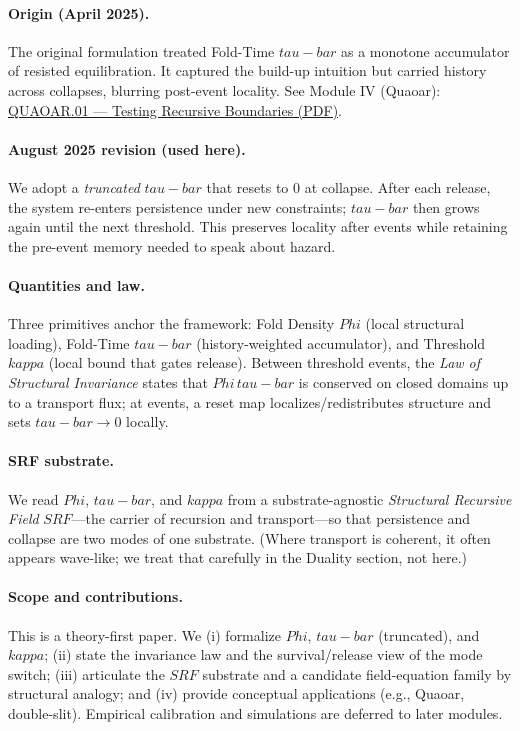 \documentclass[12pt]{article}
\newcommand{\FoldDensity}{\Phi}
\newcommand{\FoldTime}{\bar{\tau}}
\newcommand{\Threshold}{\kappa}
\newcommand{\SRF}{\mathcal{F}_{\mathrm{SR}}}
\def\FoldDensity{Phi}%
\def\FoldTime{tau-bar}%
\def\Threshold{kappa}%
\def\SRF{SRF}%
\def\bar#1{#1}%
\def\mathcal#1{#1}%
\def\mathrm#1{#1}%
\begin{document}
\paragraph{Origin (April 2025).}
The original formulation treated Fold-Time $\FoldTime$ as a monotone accumulator of resisted equilibration. It captured the build-up intuition but carried history across collapses, blurring post-event locality. See Module IV (Quaoar): \href{https://primefoldtheory.org/paper/quaoar_fold_complete_with_figures.pdf}{QUAOAR.01 — Testing Recursive Boundaries (PDF)}.


\paragraph{August 2025 revision (used here).}
We adopt a \emph{truncated} $\FoldTime$ that resets to $0$ at collapse. After each release, the system re-enters persistence under new constraints; $\FoldTime$ then grows again until the next threshold. This preserves locality after events while retaining the pre-event memory needed to speak about hazard.

\paragraph{Quantities and law.}
Three primitives anchor the framework: Fold Density $\FoldDensity$ (local structural loading), Fold-Time $\FoldTime$ (history-weighted accumulator), and Threshold $\Threshold$ (local bound that gates release). Between threshold events, the \emph{Law of Structural Invariance} states that $\FoldDensity\,\FoldTime$ is conserved on closed domains up to a transport flux; at events, a reset map localizes/redistributes structure and sets $\FoldTime \to 0$ locally.

\paragraph{SRF substrate.}
We read $\FoldDensity$, $\FoldTime$, and $\Threshold$ from a substrate-agnostic \emph{Structural Recursive Field} $\SRF$—the carrier of recursion and transport—so that persistence and collapse are two modes of one substrate. (Where transport is coherent, it often appears wave-like; we treat that carefully in the Duality section, not here.)

\paragraph{Scope and contributions.}
This is a theory-first paper. We (i) formalize $\FoldDensity$, $\FoldTime$ (truncated), and $\Threshold$; (ii) state the invariance law and the survival/release view of the mode switch; (iii) articulate the $\SRF$ substrate and a candidate field-equation family by structural analogy; and (iv) provide conceptual applications (e.g., Quaoar, double-slit). Empirical calibration and simulations are deferred to later modules.
\end{document}
